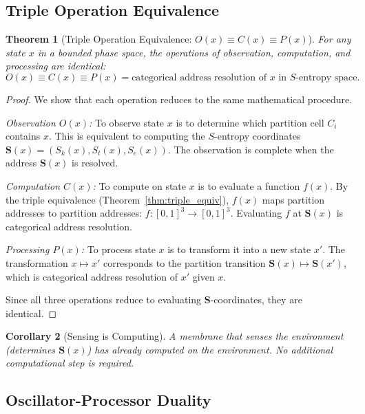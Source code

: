 \documentclass[12pt]{article}
\newtheorem{theorem}{Theorem}[section]
\newtheorem{corollary}[theorem]{Corollary}
\theoremstyle{definition}
\theoremstyle{remark}
\newcommand{\Sk}{S_k}
\newcommand{\St}{S_t}
\newcommand{\Se}{S_e}
\begin{document}
\subsection{Triple Operation Equivalence}

\begin{theorem}[Triple Operation Equivalence: $O(x) \equiv C(x) \equiv P(x)$]
\label{thm:ocp}
For any state $x$ in a bounded phase space, the operations of observation, computation, and processing are identical:
\begin{equation}
  O(x) \equiv C(x) \equiv P(x) = \text{categorical address resolution of } x \text{ in } S\text{-entropy space}.
  \label{eq:ocp}
\end{equation}
\end{theorem}

\begin{proof}
We show that each operation reduces to the same mathematical procedure.

\emph{Observation $O(x)$:} To observe state $x$ is to determine which partition cell $C_i$ contains $x$. This is equivalent to computing the $S$-entropy coordinates $\mathbf{S}(x) = (\Sk(x), \St(x), \Se(x))$. The observation is complete when the address $\mathbf{S}(x)$ is resolved.

\emph{Computation $C(x)$:} To compute on state $x$ is to evaluate a function $f(x)$. By the triple equivalence (Theorem~\ref{thm:triple_equiv}), $f(x)$ maps partition addresses to partition addresses: $f: [0,1]^3 \to [0,1]^3$. Evaluating $f$ at $\mathbf{S}(x)$ is categorical address resolution.

\emph{Processing $P(x)$:} To process state $x$ is to transform it into a new state $x'$. The transformation $x \mapsto x'$ corresponds to the partition transition $\mathbf{S}(x) \mapsto \mathbf{S}(x')$, which is categorical address resolution of $x'$ given $x$.

Since all three operations reduce to evaluating $\mathbf{S}$-coordinates, they are identical.
\end{proof}

\begin{corollary}[Sensing is Computing]
\label{cor:sensing_computing}
A membrane that senses the environment (determines $\mathbf{S}(x)$) has already computed on the environment. No additional computational step is required.
\end{corollary}

\subsection{Oscillator-Processor Duality}
\end{document}
